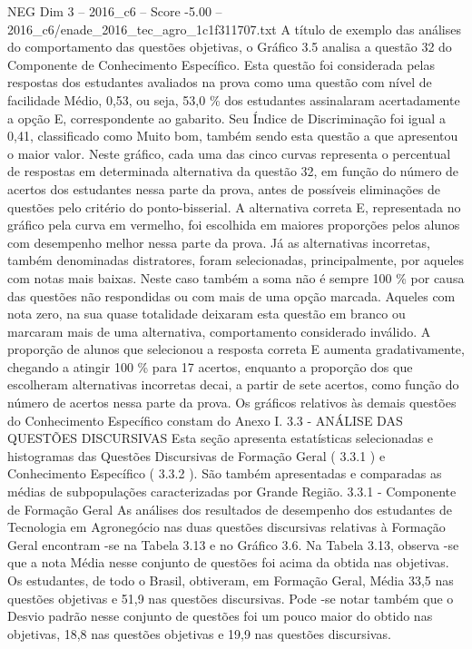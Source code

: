 \begin{textsample}{NEG Dim 3 – 2016\_c6 – Score -5.00 – 2016\_c6/enade\_2016\_tec\_agro\_1c1f311707.txt}
A título de exemplo das análises do comportamento das questões objetivas, o Gráfico 3.5 analisa a questão 32 do Componente de Conhecimento Específico.
Esta questão foi considerada pelas respostas dos estudantes avaliados na prova como uma questão com nível de facilidade Médio, 0,53, ou seja, 53,0 \% dos estudantes assinalaram acertadamente a opção E, correspondente ao gabarito.
Seu Índice de Discriminação foi igual a 0,41, classificado como Muito bom, também sendo esta questão a que apresentou o maior valor.
Neste gráfico, cada uma das cinco curvas representa o percentual de respostas em determinada alternativa da questão 32, em função do número de acertos dos estudantes nessa parte da prova, antes de possíveis eliminações de questões pelo critério do ponto-bisserial.
A alternativa correta E, representada no gráfico pela curva em vermelho, foi escolhida em maiores proporções pelos alunos com desempenho melhor nessa parte da prova.
Já as alternativas incorretas, também denominadas distratores, foram selecionadas, principalmente, por aqueles com notas mais baixas.
Neste caso também a soma não é sempre 100 \% por causa das questões não respondidas ou com mais de uma opção marcada.
Aqueles com nota zero, na sua quase totalidade deixaram esta questão em branco ou marcaram mais de uma alternativa, comportamento considerado inválido.
A proporção de alunos que selecionou a resposta correta E aumenta gradativamente, chegando a atingir 100 \% para 17 acertos, enquanto a proporção dos que escolheram alternativas incorretas decai, a partir de sete acertos, como função do número de acertos nessa parte da prova.
Os gráficos relativos às demais questões do Conhecimento Específico constam do Anexo I. 3.3 - ANÁLISE DAS QUESTÕES DISCURSIVAS Esta seção apresenta estatísticas selecionadas e histogramas das Questões Discursivas de Formação Geral ( 3.3.1 ) e Conhecimento Específico ( 3.3.2 ).
São também apresentadas e comparadas as médias de subpopulações caracterizadas por Grande Região. 3.3.1 - Componente de Formação Geral As análises dos resultados de desempenho dos estudantes de Tecnologia em Agronegócio nas duas questões discursivas relativas à Formação Geral encontram -se na Tabela 3.13 e no Gráfico 3.6.
Na Tabela 3.13, observa -se que a nota Média nesse conjunto de questões foi acima da obtida nas objetivas.
Os estudantes, de todo o Brasil, obtiveram, em Formação Geral, Média 33,5 nas questões objetivas e 51,9 nas questões discursivas.
Pode -se notar também que o Desvio padrão nesse conjunto de questões foi um pouco maior do obtido nas objetivas, 18,8 nas questões objetivas e 19,9 nas questões discursivas.

\end{textsample}
